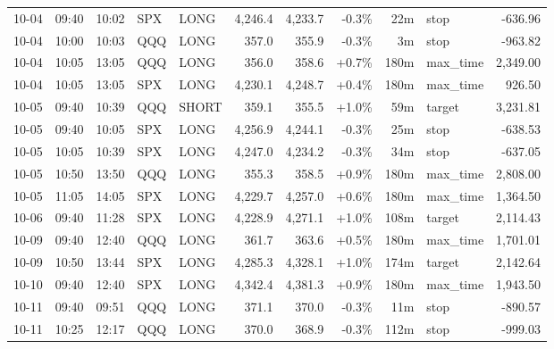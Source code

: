 \documentclass[11pt,a4paper,twoside]{article}
\begin{document}
\begin{center}
\begin{longtable}{>{\color{txtmain}}l l l l l r r r r >{\color{txtmain}}l r}
10-04 & 09:40 & 10:02 & SPX & LONG & 4,246.4 & 4,233.7 & \textcolor{lossred}{-0.3\%} & 22m & stop & \textcolor{lossred}{-636.96} \\
10-04 & 10:00 & 10:03 & QQQ & LONG & 357.0 & 355.9 & \textcolor{lossred}{-0.3\%} & 3m & stop & \textcolor{lossred}{-963.82} \\
10-04 & 10:05 & 13:05 & QQQ & LONG & 356.0 & 358.6 & \textcolor{wingreen}{+0.7\%} & 180m & max\_time & \textcolor{wingreen}{2,349.00} \\
10-04 & 10:05 & 13:05 & SPX & LONG & 4,230.1 & 4,248.7 & \textcolor{wingreen}{+0.4\%} & 180m & max\_time & \textcolor{wingreen}{926.50} \\
10-05 & 09:40 & 10:39 & QQQ & SHORT & 359.1 & 355.5 & \textcolor{wingreen}{+1.0\%} & 59m & target & \textcolor{wingreen}{3,231.81} \\
10-05 & 09:40 & 10:05 & SPX & LONG & 4,256.9 & 4,244.1 & \textcolor{lossred}{-0.3\%} & 25m & stop & \textcolor{lossred}{-638.53} \\
10-05 & 10:05 & 10:39 & SPX & LONG & 4,247.0 & 4,234.2 & \textcolor{lossred}{-0.3\%} & 34m & stop & \textcolor{lossred}{-637.05} \\
10-05 & 10:50 & 13:50 & QQQ & LONG & 355.3 & 358.5 & \textcolor{wingreen}{+0.9\%} & 180m & max\_time & \textcolor{wingreen}{2,808.00} \\
10-05 & 11:05 & 14:05 & SPX & LONG & 4,229.7 & 4,257.0 & \textcolor{wingreen}{+0.6\%} & 180m & max\_time & \textcolor{wingreen}{1,364.50} \\
10-06 & 09:40 & 11:28 & SPX & LONG & 4,228.9 & 4,271.1 & \textcolor{wingreen}{+1.0\%} & 108m & target & \textcolor{wingreen}{2,114.43} \\
10-09 & 09:40 & 12:40 & QQQ & LONG & 361.7 & 363.6 & \textcolor{wingreen}{+0.5\%} & 180m & max\_time & \textcolor{wingreen}{1,701.01} \\
10-09 & 10:50 & 13:44 & SPX & LONG & 4,285.3 & 4,328.1 & \textcolor{wingreen}{+1.0\%} & 174m & target & \textcolor{wingreen}{2,142.64} \\
10-10 & 09:40 & 12:40 & SPX & LONG & 4,342.4 & 4,381.3 & \textcolor{wingreen}{+0.9\%} & 180m & max\_time & \textcolor{wingreen}{1,943.50} \\
10-11 & 09:40 & 09:51 & QQQ & LONG & 371.1 & 370.0 & \textcolor{lossred}{-0.3\%} & 11m & stop & \textcolor{lossred}{-890.57} \\
10-11 & 10:25 & 12:17 & QQQ & LONG & 370.0 & 368.9 & \textcolor{lossred}{-0.3\%} & 112m & stop & \textcolor{lossred}{-999.03} \\

\end{longtable}
\end{center}
\end{document}
